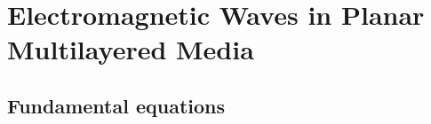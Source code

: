 




















\section{Electromagnetic Waves in Planar Multilayered Media}

\subsection{Fundamental equations}
\label{subsec:em_fundamental_equations}

